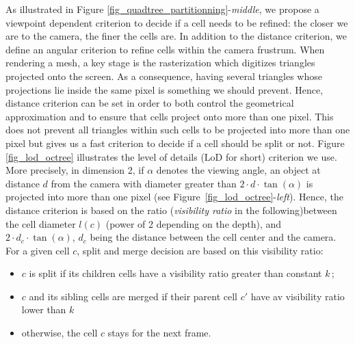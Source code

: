 \documentclass{llncs}
\begin{document}
As illustrated in Figure
\ref{fig_quadtree_partitionning}-\emph{middle}, we propose a viewpoint
dependent criterion to decide if a cell needs to be refined: the
closer we are to the camera, the finer the cells are. In addition to
the distance criterion, we define an angular criterion to refine cells
within the camera frustrum. When rendering a mesh, a key stage is the
rasterization which digitizes triangles projected onto the
screen. As a consequence, having several triangles whose projections
lie inside the same pixel is something we should prevent. Hence,
distance criterion can be set in order to both control the geometrical
approximation and to ensure that cells project onto more than one
pixel. This does not prevent all triangles within such cells to be
projected into more than one pixel but gives us a fast criterion to
decide if a cell should be split or not.  Figure \ref{fig_lod_octree}
illustrates the level of details (LoD for short) criterion we
use. More precisely, in dimension 2, if $\alpha$ denotes the viewing
angle, an object at distance $d$ from the camera with diameter greater than
 $2\cdot d\cdot\tan(\alpha)$
 is projected into more than one pixel
(see Figure~\ref{fig_lod_octree}-\emph{left}). Hence, the distance
criterion is based on the ratio (\emph{visibility ratio} in the
following)between the cell diameter $l(c)$ (power of 2 depending on
the depth), and
$2\cdot d_c\cdot\tan(\alpha)$, $d_c$ being the distance between the cell center and the camera. For a given cell $c$,
split and merge decision are based on this visibility ratio:
\begin{itemize}
\item $c$ is split if its children cells have a visibility ratio
  greater than  constant $k$\,;
\item $c$ and its sibling cells are merged if their parent cell $c'$
  have av visibility ratio lower than $k$\;
\item otherwise, the cell $c$ stays for the next frame.
\end{itemize}
%
\end{document}
